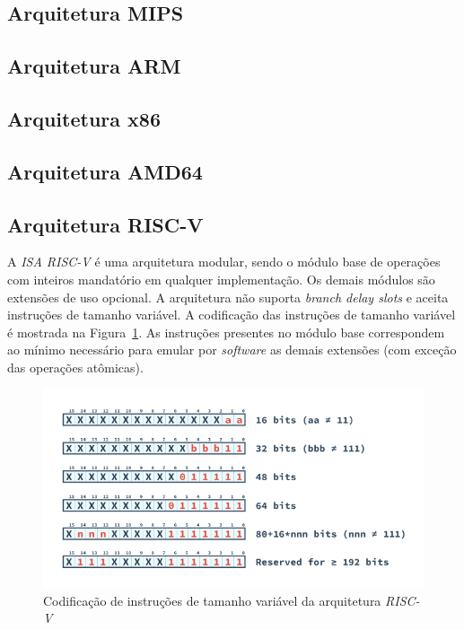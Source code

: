     \subsection{Arquitetura MIPS}
    {}

    \subsection{Arquitetura ARM}
    {}

    \subsection{Arquitetura x86}
    {}

    \subsection{Arquitetura AMD64}
    {}

    \subsection{Arquitetura RISC-V}
    {
        A \textit{ISA RISC-V} é uma arquitetura modular, sendo o módulo base de
        operações com inteiros mandatório em qualquer implementação. Os demais
        módulos são extensões de uso opcional. A arquitetura não suporta
        \textit{branch delay slots} e aceita instruções de tamanho variável. A
        codificação das instruções de tamanho variável é mostrada na
        Figura~\ref{fig:riscv_var_length}. As instruções presentes no módulo
        base correspondem ao mínimo necessário para emular por
        \textit{software} as demais extensões (com exceção das operações
        atômicas).
    }

    \begin{figure}[H]
    \centering
        \includegraphics[width=1\linewidth]{../images/RV_InstructionLength.png}
        \caption{Codificação de instruções de tamanho variável da arquitetura
                    \textit{RISC-V}}\label{fig:riscv_var_length}
    \end{figure}

